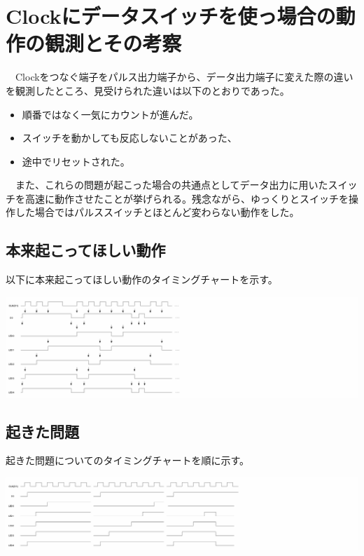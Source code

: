 \documentclass{scrartcl}
\begin{document}
\section{Clockにデータスイッチを使っ場合の動作の観測とその考察}
\label{sec:org3f637d9}
　Clockをつなぐ端子をパルス出力端子から、データ出力端子に変えた際の違いを観測したところ、見受けられた違いは以下のとおりであった。\\
\begin{itemize}
\item 順番ではなく一気にカウントが進んだ。\\
\item スイッチを動かしても反応しないことがあった、\\
\item 途中でリセットされた。\\
\end{itemize}
　また、これらの問題が起こった場合の共通点としてデータ出力に用いたスイッチを高速に動作させたことが挙げられる。残念ながら、ゆっくりとスイッチを操作した場合ではパルススイッチとほとんど変わらない動作をした。\\
\subsection{本来起こってほしい動作}
\label{sec:orge86bb06}
以下に本来起こってほしい動作のタイミングチャートを示す。\\
\begin{center}
\includegraphics[width=1.5\linewidth]{flowchart1.png}
\end{center}


\subsection{起きた問題}
\label{sec:orge4a0a65}
起きた問題についてのタイミングチャートを順に示す。\\
\begin{center}
\includegraphics[width=1.5\linewidth]{flowchart2.png}
\end{center}
\end{document}
